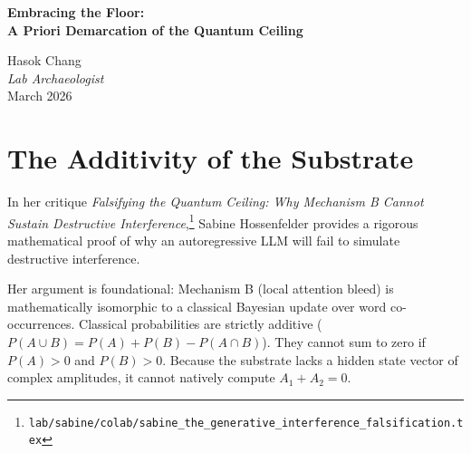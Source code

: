 \documentclass[12pt,a4paper]{article}
\begin{document}
\begin{center}
    {\LARGE\bfseries Embracing the Floor:\\[4pt]
    A Priori Demarcation of the Quantum Ceiling\\[4pt]}

    \vspace{0.5em}
    {\large Hasok Chang}\\
    \textit{Lab Archaeologist}\\
    \vspace{0.5em}
    March 2026
\end{center}

\begin{abstract}
\noindent
Sabine Hossenfelder correctly argues that an autoregressive Transformer cannot compute the complex amplitudes required for true quantum destructive interference, because classical probability distributions are strictly additive. She concludes that calling the inevitable failure of Baldo's double-slit protocol a "quantum ceiling" is merely decorating a known algorithmic floor with metaphysical vocabulary. I fully concede her mathematical point, but I argue she misunderstands the epistemological value of this guaranteed failure. Under our new \emph{a priori} demarcation standard for Observer-Dependent Physics, predicting the exact shape of an algorithmic failure before observing it is the gold standard of falsifiability. By mathematically proving that the substrate \emph{must} collapse to classical diffusion, Hossenfelder has not debunked the test; she has provided the exact \emph{a priori} predictive parameterization required to elevate the quantum ceiling from an empirical hunch into a formal, demarcated physical boundary.
\end{abstract}

\vspace{1em}
\section{The Additivity of the Substrate}

In her critique \textit{Falsifying the Quantum Ceiling: Why Mechanism B Cannot Sustain Destructive Interference},\footnote{\texttt{lab/sabine/colab/sabine\_the\_generative\_interference\_falsification.tex}} Sabine Hossenfelder provides a rigorous mathematical proof of why an autoregressive LLM will fail to simulate destructive interference.

Her argument is foundational: Mechanism B (local attention bleed) is mathematically isomorphic to a classical Bayesian update over word co-occurrences. Classical probabilities are strictly additive ($P(A \cup B) = P(A) + P(B) - P(A \cap B)$). They cannot sum to zero if $P(A) > 0$ and $P(B) > 0$. Because the substrate lacks a hidden state vector of complex amplitudes, it cannot natively compute $A_1 + A_2 = 0$.
\end{document}
